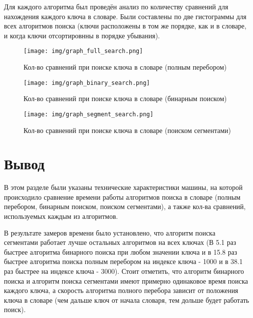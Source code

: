 \documentclass[a4paper,14pt, unknownkeysallowed]{extreport}
\begin{document}
Для каждого алгоритма был проведён анализ по количеству сравнений для нахождения каждого ключа в словаре. Были составлены по две гистограммы для всех алгоритмов поиска (ключи расположены в том же порядке, как и в словаре, и когда ключи отсортировнны в порядке убывания).


\begin{figure}[h]
	\centering
	\texttt{[image: img/graph\_full\_search.png]}
	\caption{Кол-во сравнений при поиске ключа в словаре (полным перебором)}
	\label{fig:graph_full_search}
\end{figure}

\clearpage

\begin{figure}[h]
	\centering
	\texttt{[image: img/graph\_binary\_search.png]}
	\caption{Кол-во сравнений при поиске ключа в словаре (бинарным поиском)}
	\label{fig:graph_binary_search}
\end{figure}

\clearpage

\begin{figure}[h]
	\centering
	\texttt{[image: img/graph\_segment\_search.png]}
	\caption{Кол-во сравнений при поиске ключа в словаре (поиском сегментами)}
	\label{fig:graph_segment_search}
\end{figure}

\clearpage

\section{Вывод}

В этом разделе были указаны технические характеристики машины, на которой происходило сравнение времени работы алгоритмов поиска в словаре (полным перебором, бинарным поиском, поиском сегментами), а также кол-ва сравнений, используемых каждым из алгоритмов.



В результате замеров времени было установлено, что 
алгоритм поиска сегментами работает лучше остальных алгоритмов на всех ключах (В 5.1 раз быстрее алгоритма бинарного поиска при любом значении ключа и в 15.8 раз быстрее алгоритма поиска полным перебором на индексе ключа - 1000 и в 38.1 раз быстрее на индексе ключа - 3000). Стоит отметить, что алгоритм бинарного поиска и алгоритм поиска сегментами имеют примерно одинаковое время поиска каждого ключа, а скорость алгоритма полного перебора зависит от положения ключа в словаре (чем дальше ключ от начала словаря, тем дольше будет работать поиск).
\end{document}
